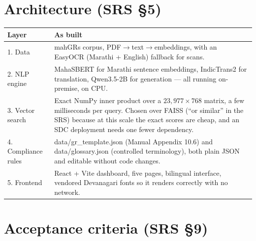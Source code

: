 \documentclass[11pt,a4paper]{article}
\newcommand{\code}[1]{{\mono\small #1}}
\begin{document}
\section{Architecture (SRS \S5)}

\begin{center}
\begin{tabular}{@{}lp{112mm}@{}}
\toprule
\textbf{Layer} & \textbf{As built} \\
\midrule
1. Data & mahGRs corpus, PDF$\rightarrow$text$\rightarrow$embeddings, with an EasyOCR
(Marathi + English) fallback for scans. \\
2. NLP engine & MahaSBERT for Marathi sentence embeddings, IndicTrans2 for translation,
Qwen3.5-2B for generation --- all running on-premise, on CPU. \\
3. Vector search & Exact NumPy inner product over a $23{,}977 \times 768$ matrix, a few
milliseconds per query. Chosen over FAISS (``or similar'' in the SRS) because at this scale the
exact scores are cheap, and an SDC deployment needs one fewer dependency. \\
4. Compliance rules & \code{data/gr\_template.json} (Manual Appendix 10.6) and
\code{data/glossary.json} (controlled terminology), both plain JSON and editable without code
changes. \\
5. Frontend & React + Vite dashboard, five pages, bilingual interface, vendored Devanagari fonts
so it renders correctly with no network. \\
\bottomrule
\end{tabular}
\end{center}

\section{Acceptance criteria (SRS \S9)}
\label{sec:accept}
\end{document}
